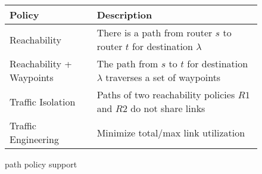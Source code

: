 \begin{wrapfigure}{r}{0.55\textwidth}
\vspace{-7mm}
\begin{minipage}{\linewidth}
	\begin{tabular}{m{5.8em}  m{14em} } 
		{\bf Policy} & {\bf Description} \\ 
		\hline
		Reachability & There is a path from router $s$ to router $t$ for destination $\lambda$ \\ \hline
		Reachability + \newline Waypoints & The path  from $s$ to $t$ for destination $\lambda$ 
		traverses a set of waypoints\\ \hline
		Traffic \newline Isolation & Paths of two reachability policies $R1$ and $R2$ do not share  links \\ \hline
		Traffic \newline Engineering  & Minimize total/max link utilization \\
	\end{tabular}
	\end{minipage}
\caption{\name path policy support}
	\label{tab:policysupport}
\end{wrapfigure}